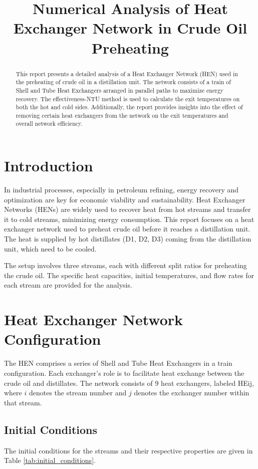\documentclass[12pt]{article}
\title{Numerical Analysis of Heat Exchanger Network in Crude Oil Preheating}
\author{}
\date{}
\begin{document}
\maketitle

\begin{abstract}
This report presents a detailed analysis of a Heat Exchanger Network (HEN) used in the preheating of crude oil in a distillation unit. The network consists of a train of Shell and Tube Heat Exchangers arranged in parallel paths to maximize energy recovery. The effectiveness-NTU method is used to calculate the exit temperatures on both the hot and cold sides. Additionally, the report provides insights into the effect of removing certain heat exchangers from the network on the exit temperatures and overall network efficiency.
\end{abstract}

\section{Introduction}
In industrial processes, especially in petroleum refining, energy recovery and optimization are key for economic viability and sustainability. Heat Exchanger Networks (HENs) are widely used to recover heat from hot streams and transfer it to cold streams, minimizing energy consumption. This report focuses on a heat exchanger network used to preheat crude oil before it reaches a distillation unit. The heat is supplied by hot distillates (D1, D2, D3) coming from the distillation unit, which need to be cooled.

The setup involves three streams, each with different split ratios for preheating the crude oil. The specific heat capacities, initial temperatures, and flow rates for each stream are provided for the analysis.

\section{Heat Exchanger Network Configuration}
The HEN comprises a series of Shell and Tube Heat Exchangers in a train configuration. Each exchanger's role is to facilitate heat exchange between the crude oil and distillates. The network consists of 9 heat exchangers, labeled HEij, where \(i\) denotes the stream number and \(j\) denotes the exchanger number within that stream.

\subsection{Initial Conditions}
The initial conditions for the streams and their respective properties are given in Table \ref{tab:initial_conditions}.
\end{document}
